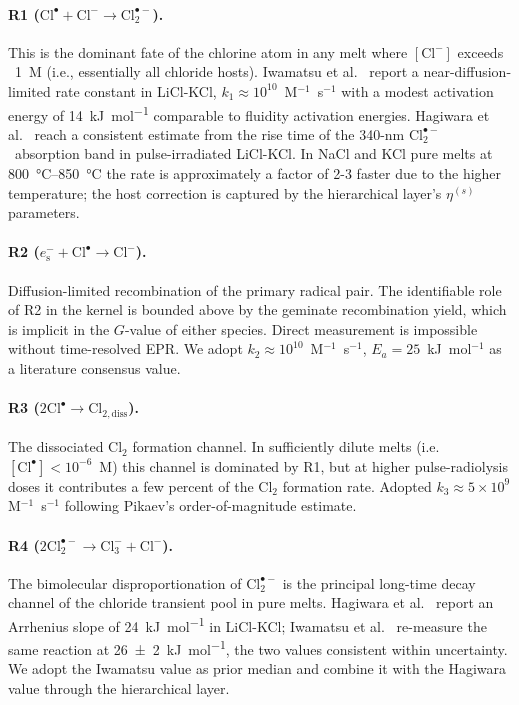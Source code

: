 \documentclass[11pt]{article}
\theoremstyle{plain}
\theoremstyle{definition}
\theoremstyle{remark}
\newcommand{\eS}{\ensuremath{e_{\mathrm{s}}^{-}}\xspace}
\newcommand{\Clt}{\ensuremath{\mathrm{Cl}_2^{\bullet-}}\xspace}
\newcommand{\Ea}{E_a}
\begin{document}
\paragraph{R1 ($\mathrm{Cl}^{\bullet} + \mathrm{Cl}^- \to \Clt$).}
This is the dominant fate of the chlorine atom in any melt where
$[\mathrm{Cl}^-]$ exceeds ~1~M (i.e., essentially all chloride hosts).
Iwamatsu et al.\ \citep{Iwamatsu2022} report a near-diffusion-limited rate
constant in LiCl-KCl, $k_1 \approx 10^{10}$~M$^{-1}$~s$^{-1}$ with a modest
activation energy of \SI{14}{\kilo\joule\per\mol} comparable to fluidity
activation energies.  Hagiwara et al.\ \citep{Hagiwara1987} reach a
consistent estimate from the rise time of the 340-nm \Clt\ absorption band
in pulse-irradiated LiCl-KCl.  In NaCl and KCl pure melts at
\SIrange{800}{850}{\celsius} the rate is approximately a factor of 2-3
faster due to the higher temperature; the host correction is captured by the
hierarchical layer's $\eta^{(s)}$ parameters.

\paragraph{R2 ($\eS + \mathrm{Cl}^{\bullet} \to \mathrm{Cl}^-$).}
Diffusion-limited recombination of the primary radical pair.  The
identifiable role of R2 in the kernel is bounded above by the geminate
recombination yield, which is implicit in the $G$-value of either species.
Direct measurement is impossible without time-resolved EPR.  We adopt
$k_2 \approx 10^{10}$~M$^{-1}$~s$^{-1}$, $\Ea = 25$~kJ~mol$^{-1}$ as a
literature consensus value.

\paragraph{R3 ($2\mathrm{Cl}^{\bullet} \to \mathrm{Cl}_{2,\mathrm{diss}}$).}
The dissociated Cl$_2$ formation channel.  In sufficiently dilute melts
(i.e.\ $[\mathrm{Cl}^{\bullet}] < 10^{-6}$~M) this channel is dominated by
R1, but at higher pulse-radiolysis doses it contributes a few percent of
the Cl$_2$ formation rate.  Adopted $k_3 \approx 5\!\times\!10^9$
M$^{-1}$~s$^{-1}$ following Pikaev's order-of-magnitude estimate.

\paragraph{R4 ($2\Clt \to \mathrm{Cl}_3^- + \mathrm{Cl}^-$).}
The bimolecular disproportionation of \Clt is the principal long-time decay
channel of the chloride transient pool in pure melts.  Hagiwara et al.\
\citep{Hagiwara1987} report an Arrhenius slope of
\SI{24}{\kilo\joule\per\mol} in LiCl-KCl; Iwamatsu et al.\ \citep{Iwamatsu2022}
re-measure the same reaction at \SI{26 \pm 2}{\kilo\joule\per\mol}, the
two values consistent within uncertainty.  We adopt the Iwamatsu value as
prior median and combine it with the Hagiwara value through the hierarchical
layer.
\end{document}
